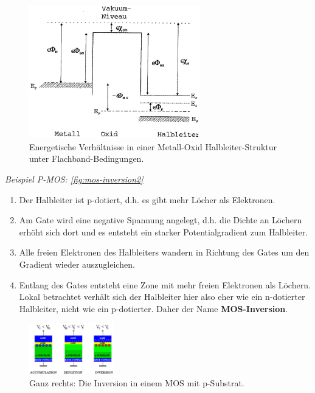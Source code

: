     \begin{figure}
        \centering
        \includegraphics[width=0.66\textwidth]{fig/mos-energie.jpg}
        \caption{Energetische Verhältnisse in einer Metall-Oxid Halbleiter-Struktur unter Flachband-Bedingungen. }
        \label{fig:my_label}
    \end{figure}
    
    \emph{Beispiel P-MOS: \autoref{fig:mos-inversion2}}
    \begin{enumerate}
        \item Der Halbleiter ist p-dotiert, d.h. es gibt mehr Löcher als Elektronen.
        \item Am Gate wird eine negative Spannung angelegt, d.h. die Dichte an Löchern erhöht sich dort und es entsteht ein starker Potentialgradient zum Halbleiter.
        \item Alle freien Elektronen des Halbleiters wandern in Richtung des Gates um den Gradient wieder auszugleichen.
        \item Entlang des Gates entsteht eine Zone mit mehr freien Elektronen als Löchern. Lokal betrachtet verhält sich der Halbleiter hier also eher wie ein n-dotierter Halbleiter, nicht wie ein p-dotierter. Daher der Name \textbf{MOS-Inversion}.
    \end{enumerate}
    
    \begin{figure}[H]
        \centering
        \includegraphics[width=0.33\textwidth]{fig/mos-inversion.jpg}
        \caption{Ganz rechts: Die Inversion in einem MOS mit p-Substrat.}
        \label{fig:mos-inversion2}
    \end{figure}
    
